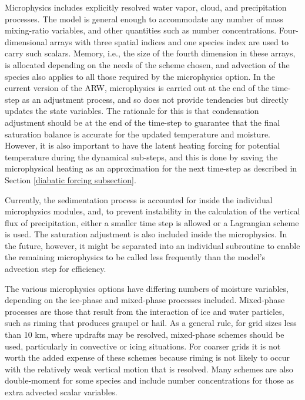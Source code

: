 Microphysics includes explicitly resolved water vapor, cloud, and 
precipitation processes. The model is general enough to accommodate any 
number of mass mixing-ratio variables, and other quantities
such as number concentrations. Four-dimensional arrays with three spatial
indices and one species index are used to carry such scalars.
Memory, i.e., the size of the fourth dimension in these
arrays, is allocated depending on the needs of the scheme chosen, 
and advection of the species also applies to all those required 
by the microphysics option. In the current version of the ARW, microphysics 
is carried out at the end of the time-step as an adjustment process, 
and so does not provide tendencies but directly updates the state variables. 
The rationale for this is that 
condensation adjustment should be at the end of the time-step
to guarantee that the final saturation balance is accurate for the 
updated temperature and moisture. However, it is also important to 
have the latent heating forcing for potential temperature during the 
dynamical sub-steps, and this is done by saving the microphysical 
heating as an approximation for the next time-step as described in Section
\ref{diabatic forcing subsection}.

Currently, the sedimentation process is accounted for inside the 
individual microphysics modules, 
and, to prevent instability in the calculation of the vertical flux of
precipitation, either a smaller time step is allowed or a Lagrangian scheme is used. 
The saturation adjustment is also 
included inside the microphysics. In the future, however, it might be separated 
into an individual 
subroutine to enable the remaining microphysics to be called less frequently 
than the model's advection step for efficiency.

The various microphysics options have differing
numbers of moisture variables, depending on the ice-phase and mixed-phase
processes included. Mixed-phase processes are those that result from
the interaction of ice and water particles, such as riming that produces
graupel or hail.
As a general rule, for grid sizes less than 10 km, where updrafts may be
resolved, mixed-phase schemes should be used, particularly in convective
or icing situations. For coarser grids it is not worth the added expense of these schemes
because riming is not likely to occur with the relatively weak vertical motion that is resolved.
Many schemes are also double-moment for some species and include
number concentrations for those as extra advected scalar variables.

